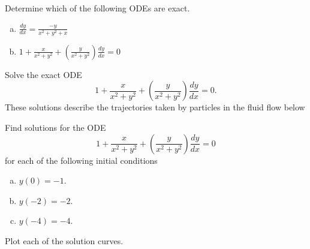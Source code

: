 \begin{applicationActivities}



\begin{activity}{10}
Determine which of the following ODEs are exact.
\begin{enumerate}[(a)]
\item \(\frac{dy}{dx}= \frac{-y}{x^2+y^2+x}\)
\item \( 1+\frac{x}{x^2+y^2} +\left(\frac{y}{x^2+y^2}\right)\frac{dy}{dx} = 0\)
\end{enumerate}
\end{activity}


\begin{activity}{15}
Solve the exact ODE 
\[ 1+\frac{x}{x^2+y^2} +\left(\frac{y}{x^2+y^2}\right)\frac{dy}{dx} = 0.\]
These solutions describe the trajectories taken by particles in the fluid flow below

\begin{center}\end{center}

\end{activity}



\begin{activity}{20}
Find solutions for the ODE
\[ 1+\frac{x}{x^2+y^2} +\left(\frac{y}{x^2+y^2}\right)\frac{dy}{dx} = 0\]
for each of the following initial conditions
\begin{enumerate}[(a)]
\item \(y(0)=-1\).
\item \(y(-2)=-2\).
\item \(y(-4)=-4\).
\end{enumerate}
Plot each of the solution curves.
\end{activity}




\end{applicationActivities}
